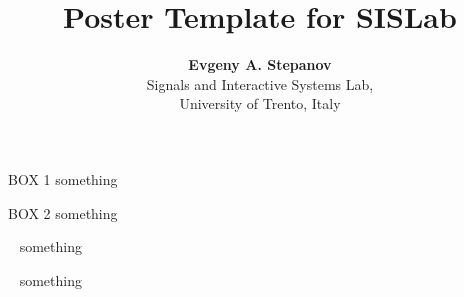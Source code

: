 \documentclass[portrait,a0,final]{a0poster}
\title{{\color{blue!25!black}Poster Template for SISLab}}
\author{
\textbf{Evgeny A. Stepanov}\\
Signals and Interactive Systems Lab,\\
University of Trento, Italy
}
\date{}
\begin{document}
\makeptitle

\begin{mainbox}{{\color{blue!25!black}BOX 1}}
something
\end{mainbox}
\begin{mainbox}{BOX 2}
something


\end{mainbox}

\vspace*{0.5cm}

\begin{mainbox}{~}
something
\end{mainbox}
\begin{mainbox}[black]{~}
something
\end{mainbox}
\end{document}
